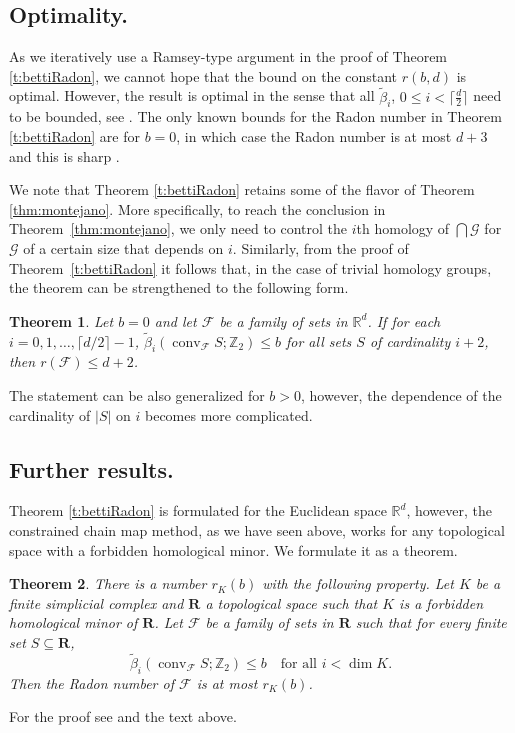 \documentclass[a4paper,12pt]{amsart}
\newcommand{\R}{\mathbb{R}} 	%
\newcommand{\Z}{\mathbb{Z}} 	%
\newcommand{\F}{\mathcal{F}} 	%
\newtheorem{theorem}{Theorem}
\theoremstyle{definition}
\begin{document}
\subsection*{Optimality.} As we iteratively use a Ramsey-type argument in the proof of Theorem \ref{t:bettiRadon}, we cannot hope that the bound on the constant $r(b,d)$ is optimal. However, the result is optimal in the sense that all $\widetilde \beta_i$, $0 \leq i < \lceil \frac{d}{2}\rceil$ need to be bounded, see \cite[Example~5.1]{bettiRadon}.
The only known bounds for the Radon number in Theorem \ref{t:bettiRadon} are for $b=0$, in which case the Radon number is at most $d+3$ and this is sharp \cite[Theorem 5.2]{bettiRadon}.

We note that Theorem \ref{t:bettiRadon} retains some of the flavor of Theorem \ref{thm:montejano}. More specifically, to reach the conclusion in Theorem~\ref{thm:montejano}, we only need to control the $i$th homology of $\bigcap \mathcal G$
for $\mathcal G$ of a certain size that depends on $i$.
Similarly, from the proof of Theorem~\ref{t:bettiRadon} it follows that, in the case of trivial homology groups, the theorem can be strengthened to the following form.
\begin{theorem}
Let $b=0$ and let $\mathcal F$ be a family of sets in $\R^d$. If for each $i=0,1,\ldots, \lceil d/2 \rceil-1$, $\widetilde{\beta}_{i}(\operatorname{conv}_{\F}S;\Z_2)\leq b$ for all sets $S$ of cardinality $i+2$, then $r(\mathcal F)\leq d+2$. 
\end{theorem}
The statement can be also generalized for $b>0$,
however, the dependence of the cardinality of $|S|$ on $i$ becomes more complicated.


\subsection*{Further results.} Theorem \ref{t:bettiRadon} is formulated for the Euclidean space $\mathbb R^d$, however, the constrained chain map method, as we have seen above, works for any topological space with a forbidden homological minor.  We formulate it as a theorem.

\begin{theorem}\label{t:radonGen}
There is a number $r_K(b)$
 with the following property. Let $K$ be a finite simplicial complex and $\mathbf R$ a topological space such that $K$ is a forbidden homological minor of $\mathbf R$. Let $\mathcal F$ be a family of sets in $\mathbf R$ such that 
 for every finite set $S\subseteq \mathbf R$,
 \[\widetilde{\beta}_i(\operatorname{conv}_{\mathcal F}S;\Z_2)\leq b\quad \text{for all }i< \dim K.\]
 Then the Radon number of $\mathcal F$ is at most $r_K(b)$.
\end{theorem}
For the proof see \cite[Prop. 3.6 and 3.7]{bettiRadon} and the text above.
\end{document}
